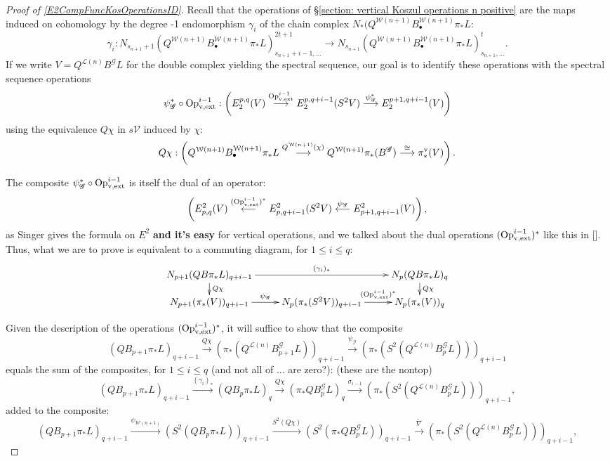 \documentclass[11pt]{amsart}
\theoremstyle{plain}
\theoremstyle{definition}
\renewcommand{\to}{\longrightarrow}
\newcommand{\from}{\longleftarrow}
\newcommand{\scrQ}{\mathscr{Q}}
\newcommand{\scrR}{\mathscr{R}}
\newcommand{\scrT}{\mathscr{T}}
\newcommand{\scrY}{\mathscr{Y}}
\newcommand{\scrI}{\mathscr{I}}
\newcommand{\scrO}{\mathscr{O}}
\newcommand{\scrP}{\mathscr{P}}
\newcommand{\scrS}{\mathscr{S}}
\newcommand{\scrG}{\mathscr{G}}
\newcommand{\scrH}{\mathscr{H}}
\newcommand{\scrJ}{\mathscr{J}}
\newcommand{\scrK}{\mathscr{K}}
\newcommand{\scrL}{\mathscr{L}}
\newcommand{\scrZ}{\mathscr{Z}}
\newcommand{\scrN}{\mathscr{N}}
\newcommand{\scrM}{\mathscr{M}}
\newcommand{\calW}{\mathcal{W}}
\newcommand{\calL}{\mathcal{L}}
\newcommand{\calV}{\mathcal{V}}
\theoremstyle{plain}
\newcommand{\BSW}{{\scrG}}%
\newcommand{\BSWres}{B^\BSW}%
\newcommand{\vExtCohOp}{\textup{Op}_\textup{v,ext}}
\begin{document}
\begin{Composite functor spectral sequences}
\begin{tricky proofs of operation compatibilities}
\begin{proof}[Proof of \ref{E2CompFuncKosOperationsID}]
Recall that the operations of \S\ref{section: vertical Koszul operations n positive} are the maps induced on cohomology by the degree -1 endomorphism $\gamma_i$ of the chain complex $N_*(Q^{\calW(n+1)} B^{\calW(n+1)}_{\bullet}\pi_*L$:
\[\gamma_i:N_{s_{n+1}+1}(Q^{\calW(n+1)} B^{\calW(n+1)}_{\bullet}\pi_*L)^{2t+1}_{s_{n+1}+i-1,\ldots}\to N_{s_{n+1}}(Q^{\calW(n+1)} B^{\calW(n+1)}_{\bullet}\pi_*L)^{t}_{s_{n+1},\ldots}.\]
If we write $V=Q^{\calL(n)}\BSWres L$ for the double complex yielding the spectral sequence, our goal is to identify these operations with the spectral sequence operations
\[\psi_{\BSW}^*\circ\vExtCohOp^{i-1}:\left(E^{p,q}_2(V)\overset{\vExtCohOp^{i-1}}{\to} E^{p,q+i-1}_2(S^2V)\overset{\psi_{\BSW}^*}{\to}E^{p+1,q+i-1}_2(V)\right)\]
using the equivalence $Q\chi$ in $s\calV$ induced by $\chi$:%
\[Q\chi:\left(Q^{\calW(n+1)}B^{\calW(n+1)}_{\bullet}\pi_*L\overset{Q^{\calW(n+1)}(\chi)}{\to} Q^{\calW(n+1)}\pi_*(\BSWres )\overset{\cong }{\to}\pi_*^\textup{v}(V)\right).\]

The composite $\psi_{\BSW}^*\circ\vExtCohOp^{i-1}$ is itself the dual of an operator:
\[\left(E_{p,q}^2(V)\overset{(\vExtCohOp^{i-1})^*}{\from} E_{p,q+i-1}^2(S^2V)\overset{\psi_{\BSW}}{\from}E_{p+1,q+i-1}^2(V)\right),\]
as Singer gives the formula on $E^2$ \textbf{and it's easy} for vertical operations, and we talked about the dual operations $(\vExtCohOp^{i-1})^*$ like this in []. Thus, what we are to prove is equivalent to a commuting diagram, for $1\leq i\leq q$:
\[\xymatrix@R=4mm{
N_{p+1}(QB\pi_*L)_{q+i-1}\ar[rr]^-{(\gamma_i)_*}
\ar[d]^-{Q\chi}
&%
&%
N_p(QB\pi_*L)_q\ar[d]^-{Q\chi}
\\%
N_{p+1}(\pi_*(V))_{q+i-1}\ar[r]^-{\psi_{\BSW}}
&%
N_{p}(\pi_*(S^2V))_{q+i-1}\ar[r]^-{(\vExtCohOp^{i-1})^*}
&%
N_p(\pi_*(V))_q%
}\]

Given the description of the operations $(\vExtCohOp^{i-1})^*$, it will suffice to show that the composite
\[(QB_{p+1}\pi_*L)_{q+i-1}\overset{Q\chi}{\to}(\pi_*(Q^{\calL(n)}\BSWres_{p+1}L))_{q+i-1}\overset{\psi_{\BSW}}{\to}(\pi_*(S^2(Q^{\calL(n)}\BSWres_pL)))_{q+i-1}\]
equals the sum of the composites, for $1\leq i \leq q$ (and not all of ... are zero?): (these are the nontop)
\[(QB_{p+1}\pi_* L)_{q+i-1}\overset{(\gamma_i)_*}{\to} (QB_{p}\pi_* L)_q\overset{Q\chi}{\to} (\pi_*Q\BSWres_{p}L)_q\overset{\sigma_{i-1}}{\to} (\pi_*(S^2(Q^{\calL(n)}\BSWres_{p}L)))_{q+i-1},\]
added to the composite:
\[(QB_{p+1}\pi_* L)_{q+i-1}\overset{\psi_{\calW(n+1)}}{\to}(S^2(QB_{p}\pi_* L))_{q+i-1}\overset{S^2(Q\chi)}{\to}
(S^2(\pi_*Q\BSWres_pL))_{q+i-1}\overset{\widetilde{\nabla}}{\to}
(\pi_*(S^2(Q^{\calL(n)}\BSWres_{p}L)))_{q+i-1},\]



\end{proof}
\end{tricky proofs of operation compatibilities}
\end{Composite functor spectral sequences}
\end{document}
